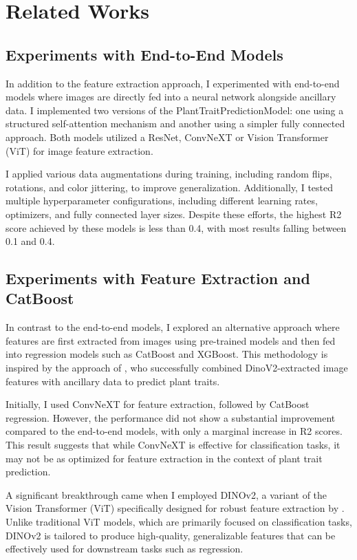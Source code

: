 \documentclass{article}
\begin{document}
\section{Related Works}

\subsection{Experiments with End-to-End Models}
In addition to the feature extraction approach, I experimented with end-to-end models where images are directly fed into a neural network alongside ancillary data. I implemented two versions of the PlantTraitPredictionModel: one using a structured self-attention mechanism and another using a simpler fully connected approach. Both models utilized a ResNet, ConvNeXT or Vision Transformer (ViT) for image feature extraction.

I applied various data augmentations during training, including random flips, rotations, and color jittering, to improve generalization. Additionally, I tested multiple hyperparameter configurations, including different learning rates, optimizers, and fully connected layer sizes. Despite these efforts, the highest R2 score achieved by these models is less than 0.4, with most results falling between 0.1 and 0.4.

\subsection{Experiments with Feature Extraction and CatBoost}
In contrast to the end-to-end models, I explored an alternative approach where features are first extracted from images using pre-trained models and then fed into regression models such as CatBoost and XGBoost. This methodology is inspired by the approach of \citet{korotas2024}, who successfully combined DinoV2-extracted image features with ancillary data to predict plant traits.

Initially, I used ConvNeXT for feature extraction, followed by CatBoost regression. However, the performance did not show a substantial improvement compared to the end-to-end models, with only a marginal increase in R2 scores. This result suggests that while ConvNeXT is effective for classification tasks, it may not be as optimized for feature extraction in the context of plant trait prediction.

A significant breakthrough came when I employed DINOv2, a variant of the Vision Transformer (ViT) specifically designed for robust feature extraction by \citet{DINOv2}. Unlike traditional ViT models, which are primarily focused on classification tasks, DINOv2 is tailored to produce high-quality, generalizable features that can be effectively used for downstream tasks such as regression.
\end{document}
